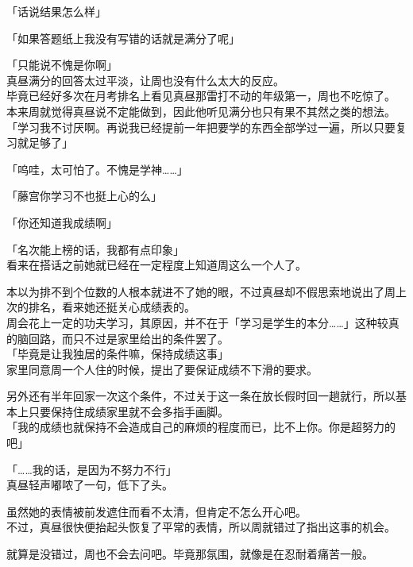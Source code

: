 「话说结果怎么样」

「如果答题纸上我没有写错的话就是满分了呢」

「只能说不愧是你啊」\\

真昼满分的回答太过平淡，让周也没有什么太大的反应。\\

毕竟已经好多次在月考排名上看见真昼那雷打不动的年级第一，周也不吃惊了。\\

本来周就觉得真昼说不定能做到，因此他听见满分也只有果不其然之类的想法。\\

「学习我不讨厌啊。再说我已经提前一年把要学的东西全部学过一遍，所以只要复习就足够了」

「呜哇，太可怕了。不愧是学神……」

「藤宫你学习不也挺上心的么」

「你还知道我成绩啊」

「名次能上榜的话，我都有点印象」\\

看来在搭话之前她就已经在一定程度上知道周这么一个人了。

本以为排不到个位数的人根本就进不了她的眼，不过真昼却不假思索地说出了周上次的排名，看来她还挺关心成绩表的。\\

周会花上一定的功夫学习，其原因，并不在于「学习是学生的本分……」这种较真的脑回路，而只不过是家里给出的条件罢了。\\

「毕竟是让我独居的条件嘛，保持成绩这事」\\

家里同意周一个人住的时候，提出了要保证成绩不下滑的要求。

另外还有半年回家一次这个条件，不过关于这一条在放长假时回一趟就行，所以基本上只要保持住成绩家里就不会多指手画脚。\\

「我的成绩也就保持不会造成自己的麻烦的程度而已，比不上你。你是超努力的吧」

「……我的话，是因为不努力不行」\\

真昼轻声嘟哝了一句，低下了头。

虽然她的表情被前发遮住而看不太清，但肯定不怎么开心吧。\\

不过，真昼很快便抬起头恢复了平常的表情，所以周就错过了指出这事的机会。

就算是没错过，周也不会去问吧。毕竟那氛围，就像是在忍耐着痛苦一般。\\

